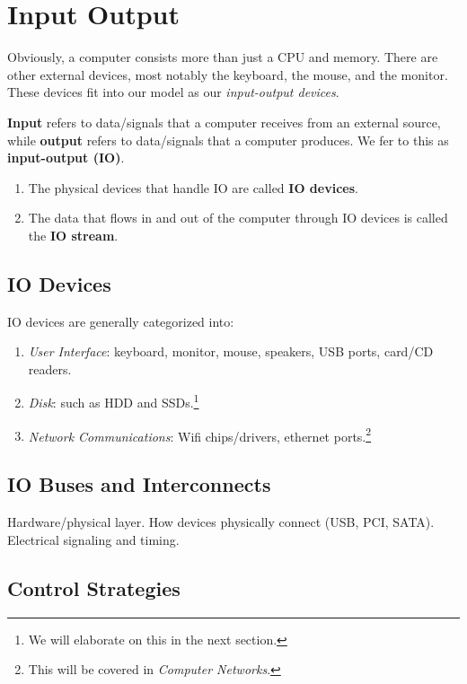 \section{Input Output}

  Obviously, a computer consists more than just a CPU and memory. There are other external devices, most notably the keyboard, the mouse, and the monitor. These devices fit into our model as our \textit{input-output devices}. 

  \begin{definition}
    \label{def:input-output}
    \textbf{Input} refers to data/signals that a computer receives from an external source, while \textbf{output} refers to data/signals that a computer produces. We fer to this as \textbf{input-output (IO)}. 
    \begin{enumerate}
      \item The physical devices that handle IO are called \textbf{IO devices}. 
      \item The data that flows in and out of the computer through IO devices is called the \textbf{IO stream}. 
    \end{enumerate}
  \end{definition}

\subsection{IO Devices}

  IO devices are generally categorized into: 
  \begin{enumerate}
    \item \textit{User Interface}: keyboard, monitor, mouse, speakers, USB ports, card/CD readers. 
    \item \textit{Disk}: such as HDD and SSDs.\footnote{We will elaborate on this in the next section. }
    \item \textit{Network Communications}: Wifi chips/drivers, ethernet ports.\footnote{This will be covered in \textit{Computer Networks}. }
  \end{enumerate}

\subsection{IO Buses and Interconnects}
  
  Hardware/physical layer. How devices physically connect (USB, PCI, SATA). Electrical signaling and timing. 

\subsection{Control Strategies}

